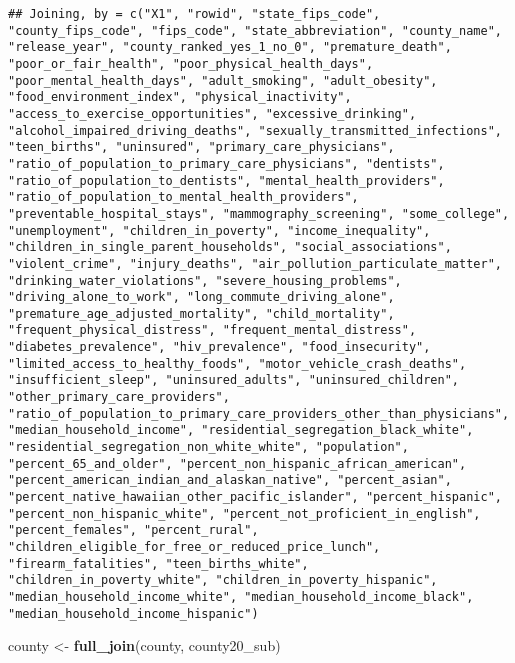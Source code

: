 \documentclass[
]{article}
\newenvironment{Shaded}{\begin{snugshade}}{\end{snugshade}}
\newcommand{\KeywordTok}[1]{\textcolor[rgb]{0.13,0.29,0.53}{\textbf{#1}}}
\newcommand{\NormalTok}[1]{#1}
\newcommand{\StringTok}[1]{\textcolor[rgb]{0.31,0.60,0.02}{#1}}
\begin{document}
\begin{verbatim}
## Joining, by = c("X1", "rowid", "state_fips_code", "county_fips_code", "fips_code", "state_abbreviation", "county_name", "release_year", "county_ranked_yes_1_no_0", "premature_death", "poor_or_fair_health", "poor_physical_health_days", "poor_mental_health_days", "adult_smoking", "adult_obesity", "food_environment_index", "physical_inactivity", "access_to_exercise_opportunities", "excessive_drinking", "alcohol_impaired_driving_deaths", "sexually_transmitted_infections", "teen_births", "uninsured", "primary_care_physicians", "ratio_of_population_to_primary_care_physicians", "dentists", "ratio_of_population_to_dentists", "mental_health_providers", "ratio_of_population_to_mental_health_providers", "preventable_hospital_stays", "mammography_screening", "some_college", "unemployment", "children_in_poverty", "income_inequality", "children_in_single_parent_households", "social_associations", "violent_crime", "injury_deaths", "air_pollution_particulate_matter", "drinking_water_violations", "severe_housing_problems", "driving_alone_to_work", "long_commute_driving_alone", "premature_age_adjusted_mortality", "child_mortality", "frequent_physical_distress", "frequent_mental_distress", "diabetes_prevalence", "hiv_prevalence", "food_insecurity", "limited_access_to_healthy_foods", "motor_vehicle_crash_deaths", "insufficient_sleep", "uninsured_adults", "uninsured_children", "other_primary_care_providers", "ratio_of_population_to_primary_care_providers_other_than_physicians", "median_household_income", "residential_segregation_black_white", "residential_segregation_non_white_white", "population", "percent_65_and_older", "percent_non_hispanic_african_american", "percent_american_indian_and_alaskan_native", "percent_asian", "percent_native_hawaiian_other_pacific_islander", "percent_hispanic", "percent_non_hispanic_white", "percent_not_proficient_in_english", "percent_females", "percent_rural", "children_eligible_for_free_or_reduced_price_lunch", "firearm_fatalities", "teen_births_white", "children_in_poverty_white", "children_in_poverty_hispanic", "median_household_income_white", "median_household_income_black", "median_household_income_hispanic")
\end{verbatim}

\begin{Shaded}
\begin{Highlighting}[]
\NormalTok{county <-}\StringTok{ }\KeywordTok{full_join}\NormalTok{(county, county20_sub)}
\end{Highlighting}
\end{Shaded}
\end{document}

